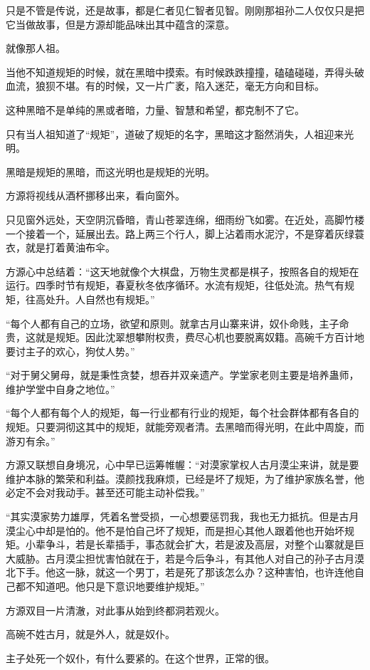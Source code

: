 \begin{this_body}
只是不管是传说，还是故事，都是仁者见仁智者见智。刚刚那祖孙二人仅仅只是把它当做故事，但是方源却能品味出其中蕴含的深意。

就像那人祖。

当他不知道规矩的时候，就在黑暗中摸索。有时候跌跌撞撞，磕磕碰碰，弄得头破血流，狼狈不堪。有的时候，又一片广袤，陷入迷茫，毫无方向和目标。

这种黑暗不是单纯的黑或者暗，力量、智慧和希望，都克制不了它。

只有当人祖知道了“规矩”，道破了规矩的名字，黑暗这才豁然消失，人祖迎来光明。

黑暗是规矩的黑暗，而这光明也是规矩的光明。

方源将视线从酒杯挪移出来，看向窗外。

只见窗外远处，天空阴沉昏暗，青山苍翠连绵，细雨纷飞如雾。在近处，高脚竹楼一个接着一个，延展出去。路上两三个行人，脚上沾着雨水泥泞，不是穿着灰绿蓑衣，就是打着黄油布伞。

方源心中总结着：“这天地就像个大棋盘，万物生灵都是棋子，按照各自的规矩在运行。四季时节有规矩，春夏秋冬依序循环。水流有规矩，往低处流。热气有规矩，往高处升。人自然也有规矩。”

“每个人都有自己的立场，欲望和原则。就拿古月山寨来讲，奴仆命贱，主子命贵，这就是规矩。因此沈翠想攀附权贵，费尽心机也要脱离奴籍。高碗千方百计地要讨主子的欢心，狗仗人势。”

“对于舅父舅母，就是秉性贪婪，想吞并双亲遗产。学堂家老则主要是培养蛊师，维护学堂中自身之地位。”

“每个人都有每个人的规矩，每一行业都有行业的规矩，每个社会群体都有各自的规矩。只要洞彻这其中的规矩，就能旁观者清。去黑暗而得光明，在此中周旋，而游刃有余。”

方源又联想自身境况，心中早已运筹帷幄：“对漠家掌权人古月漠尘来讲，就是要维护本脉的繁荣和利益。漠颜找我麻烦，已经是坏了规矩，为了维护家族名誉，他必定不会对我动手。甚至还可能主动补偿我。”

“其实漠家势力雄厚，凭着名誉受损，一心想要惩罚我，我也无力抵抗。但是古月漠尘心中却是怕的。他不是怕自己坏了规矩，而是担心其他人跟着他也开始坏规矩。小辈争斗，若是长辈插手，事态就会扩大，若是波及高层，对整个山寨就是巨大威胁。古月漠尘担忧害怕就在于，若是今后争斗，有其他人对自己的孙子古月漠北下手。他这一脉，就这一个男丁，若是死了那该怎么办？这种害怕，也许连他自己都不知道吧。他只是下意识地要维护规矩。”

方源双目一片清澈，对此事从始到终都洞若观火。

高碗不姓古月，就是外人，就是奴仆。

主子处死一个奴仆，有什么要紧的。在这个世界，正常的很。


\end{this_body}
